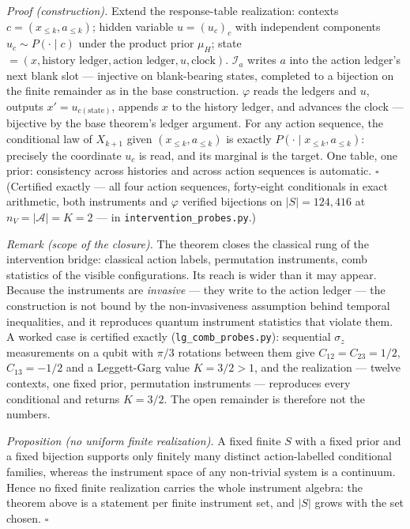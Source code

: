 \documentclass[
]{article}
\begin{document}
\emph{Proof (construction).} Extend the response-table realization:
contexts \(c = (x_{\leq k}, a_{\leq k})\); hidden variable
\(u = (u_c)_c\) with independent components \(u_c \sim P(\cdot \mid c)\)
under the product prior \(\mu_H\); state
\(= (x, \text{history ledger}, \text{action ledger}, u, \text{clock})\).
\(\mathcal{I}_a\) writes \(a\) into the action ledger's next blank slot
--- injective on blank-bearing states, completed to a bijection on the
finite remainder as in the base construction. \(\varphi\) reads the
ledgers and \(u\), outputs \(x' = u_{c(\text{state})}\), appends \(x\)
to the history ledger, and advances the clock --- bijective by the base
theorem's ledger argument. For any action sequence, the conditional law
of \(X_{k+1}\) given \((x_{\leq k}, a_{\leq k})\) is exactly
\(P(\cdot \mid x_{\leq k}, a_{\leq k})\): precisely the coordinate
\(u_c\) is read, and its marginal is the target. One table, one prior:
consistency across histories and across action sequences is automatic.
\(\square\) (Certified exactly --- all four action sequences,
forty-eight conditionals in exact arithmetic, both instruments and
\(\varphi\) verified bijections on \(|S| = 124{,}416\) at
\(n_V = |\mathcal{A}| = K = 2\) --- in
\texttt{intervention\_probes.py}.)

\emph{Remark (scope of the closure).} The theorem closes the classical
rung of the intervention bridge: classical action labels, permutation
instruments, comb statistics of the visible configurations. Its reach is
wider than it may appear. Because the instruments are \emph{invasive}
--- they write to the action ledger --- the construction is not bound by
the non-invasiveness assumption behind temporal inequalities, and it
reproduces quantum instrument statistics that violate them. A worked
case is certified exactly (\texttt{lg\_comb\_probes.py}): sequential
\(\sigma_z\) measurements on a qubit with \(\pi/3\) rotations between
them give \(C_{12} = C_{23} = 1/2\), \(C_{13} = -1/2\) and a
Leggett-Garg value \(K = 3/2 > 1\), and the realization --- twelve
contexts, one fixed prior, permutation instruments --- reproduces every
conditional and returns \(K = 3/2\). The open remainder is therefore not
the numbers.

\emph{Proposition (no uniform finite realization).} A fixed finite \(S\)
with a fixed prior and a fixed bijection supports only finitely many
distinct action-labelled conditional families, whereas the instrument
space of any non-trivial system is a continuum. Hence no fixed finite
realization carries the whole instrument algebra: the theorem above is a
statement per finite instrument set, and \(|S|\) grows with the set
chosen. \(\square\)
\end{document}
